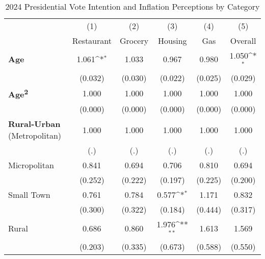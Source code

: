 \begin{table}[htbp]\centering
\def\sym#1{\ifmmode^{#1}\else\(^{#1}\)\fi}
\caption{2024 Presidential Vote Intention and Inflation Perceptions by Category}
\begin{tabular}{l*{5}{c}}
\hline\hline
                    &\multicolumn{1}{c}{(1)}&\multicolumn{1}{c}{(2)}&\multicolumn{1}{c}{(3)}&\multicolumn{1}{c}{(4)}&\multicolumn{1}{c}{(5)}\\
                    &\multicolumn{1}{c}{Restaurant}&\multicolumn{1}{c}{Grocery}&\multicolumn{1}{c}{Housing}&\multicolumn{1}{c}{Gas}&\multicolumn{1}{c}{Overall}\\
\hline
\textbf{Age}        &       1.061\sym{*}  &       1.033         &       0.967         &       0.980         &       1.050\sym{*}  \\
                    &     (0.032)         &     (0.030)         &     (0.022)         &     (0.025)         &     (0.029)         \\
\textbf{Age\textsuperscript{2}}&       1.000         &       1.000         &       1.000         &       1.000         &       1.000         \\
                    &     (0.000)         &     (0.000)         &     (0.000)         &     (0.000)         &     (0.000)         \\
\textbf{Rural-Urban} (Metropolitan)&       1.000         &       1.000         &       1.000         &       1.000         &       1.000         \\
                    &         (.)         &         (.)         &         (.)         &         (.)         &         (.)         \\
Micropolitan        &       0.841         &       0.694         &       0.706         &       0.810         &       0.694         \\
                    &     (0.252)         &     (0.222)         &     (0.197)         &     (0.225)         &     (0.200)         \\
Small Town          &       0.761         &       0.784         &       0.577\sym{*}  &       1.171         &       0.832         \\
                    &     (0.300)         &     (0.322)         &     (0.184)         &     (0.444)         &     (0.317)         \\
Rural               &       0.686         &       0.860         &       1.976\sym{**} &       1.613         &       1.569         \\
                    &     (0.203)         &     (0.335)         &     (0.673)         &     (0.588)         &     (0.550)         \\

\end{tabular}
\end{table}
